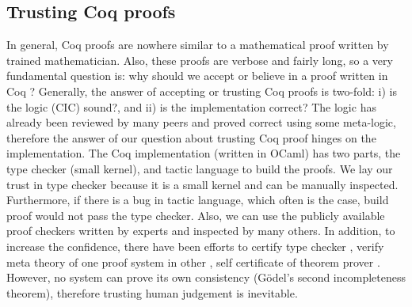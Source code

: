  \subsection{Trusting Coq proofs}
 \label{sec:coqproof}
  In general, Coq proofs are nowhere similar to a mathematical 
  proof written by trained mathematician. Also, these proofs 
  are verbose and fairly long, so a 
  very fundamental question is: why should we 
  accept or believe in a proof written in Coq \citep{pollack1998believe}?  Generally, the answer of 
	accepting or trusting Coq proofs is two-fold:
  i) is the logic (CIC) sound?, and ii) is the implementation correct?
  The logic has already been reviewed by many peers and proved correct 
  using some meta-logic, therefore the answer of our question about trusting Coq proof 
  hinges on the implementation. 
  The Coq implementation (written in OCaml)  has two parts, the type checker (small kernel), 
  and tactic language to build the proofs.
  We lay our trust in type checker because it is a small kernel and can be 
  manually inspected. Furthermore, if there
  is a bug in tactic language, which often is the case,  build proof would 
  not pass the type checker.  Also, we can use the publicly available proof 
  checkers written by experts and inspected by many others. In addition, to increase the 
  confidence, there have been 
  efforts to certify type checker \citep{Appel2003}
  \citep{barras1996coq}, verify meta theory of one proof system 
  in other \citep{10.1007/978-3-319-08970-6_3}, self certificate of 
  theorem prover \citep{10.1007/11814771_17}. However, no system can 
  prove its own consistency (G{\"o}del's second incompleteness theorem), therefore
  trusting human judgement is inevitable.
  
 
